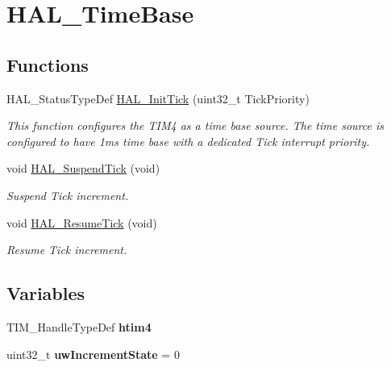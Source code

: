 \hypertarget{group__HAL__TimeBase}{}\section{H\+A\+L\+\_\+\+Time\+Base}
\label{group__HAL__TimeBase}
\subsection*{Functions}
\begin{DoxyCompactItemize}
\item 
H\+A\+L\+\_\+\+Status\+Type\+Def \mbox{\hyperlink{group__HAL__TimeBase_ga879cdb21ef051eb81ec51c18147397d5}{H\+A\+L\+\_\+\+Init\+Tick}} (uint32\+\_\+t Tick\+Priority)
\begin{DoxyCompactList}\small\item\em This function configures the T\+I\+M4 as a time base source. The time source is configured to have 1ms time base with a dedicated Tick interrupt priority. \end{DoxyCompactList}\item 
void \mbox{\hyperlink{group__HAL__TimeBase_gaaf651af2afe688a991c657f64f8fa5f9}{H\+A\+L\+\_\+\+Suspend\+Tick}} (void)
\begin{DoxyCompactList}\small\item\em Suspend Tick increment. \end{DoxyCompactList}\item 
void \mbox{\hyperlink{group__HAL__TimeBase_ga24e0ee9dae1ec0f9d19200f5575ff790}{H\+A\+L\+\_\+\+Resume\+Tick}} (void)
\begin{DoxyCompactList}\small\item\em Resume Tick increment. \end{DoxyCompactList}\end{DoxyCompactItemize}
\subsection*{Variables}
\begin{DoxyCompactItemize}
\item 
\mbox{\label{group__HAL__TimeBase_ga85788cec5a97ee377e4ee2e74f026484}} 
T\+I\+M\+\_\+\+Handle\+Type\+Def {\bfseries htim4}
\item 
\mbox{\label{group__HAL__TimeBase_gad252e5fa14fe03797c816cfb14962693}} 
uint32\+\_\+t {\bfseries uw\+Increment\+State} = 0
\end{DoxyCompactItemize}


